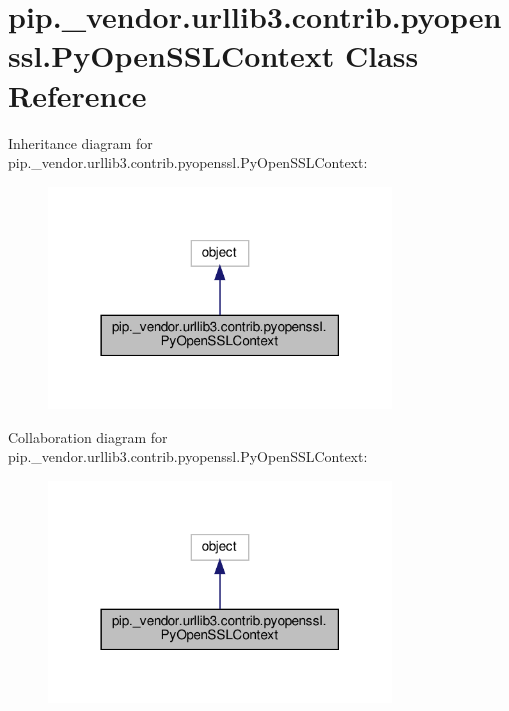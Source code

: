\hypertarget{classpip_1_1__vendor_1_1urllib3_1_1contrib_1_1pyopenssl_1_1PyOpenSSLContext}{}\section{pip.\+\_\+vendor.\+urllib3.\+contrib.\+pyopenssl.\+Py\+Open\+S\+S\+L\+Context Class Reference}
\label{classpip_1_1__vendor_1_1urllib3_1_1contrib_1_1pyopenssl_1_1PyOpenSSLContext}


Inheritance diagram for pip.\+\_\+vendor.\+urllib3.\+contrib.\+pyopenssl.\+Py\+Open\+S\+S\+L\+Context\+:
\nopagebreak
\begin{figure}[H]
\begin{center}
\leavevmode
\includegraphics[width=258pt]{classpip_1_1__vendor_1_1urllib3_1_1contrib_1_1pyopenssl_1_1PyOpenSSLContext__inherit__graph}
\end{center}
\end{figure}


Collaboration diagram for pip.\+\_\+vendor.\+urllib3.\+contrib.\+pyopenssl.\+Py\+Open\+S\+S\+L\+Context\+:
\nopagebreak
\begin{figure}[H]
\begin{center}
\leavevmode
\includegraphics[width=258pt]{classpip_1_1__vendor_1_1urllib3_1_1contrib_1_1pyopenssl_1_1PyOpenSSLContext__coll__graph}
\end{center}
\end{figure}
